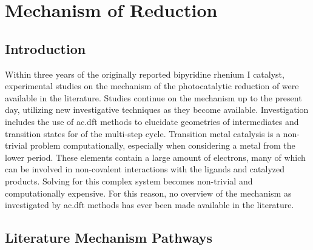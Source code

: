 \chapter{Mechanism of \texorpdfstring{}{CO2} Reduction}\label{chap.mech}

\section{Introduction}

Within three years of the originally reported bipyridine rhenium I catalyst, experimental studies on the mechanism of the photocatalytic reduction of  were available in the literature\autocite{hawecker1986}. Studies continue on the mechanism up to the present day\autocite{koike2002, machan2014}, utilizing new investigative techniques as they become available. Investigation includes the use of \gls{ac.dft} methods to elucidate geometries of intermediates and transition states for of the multi-step cycle. Transition metal catalysis is a non-trivial problem computationally, especially when considering a metal from the lower period. These elements contain a large amount of electrons, many of which can be involved in non-covalent interactions with the ligands and catalyzed products. Solving for this complex system becomes non-trivial and computationally expensive. For this reason, no overview of the mechanism as investigated by \gls{ac.dft} methods has ever been made available in the literature. 

\section{Literature Mechanism Pathways}

